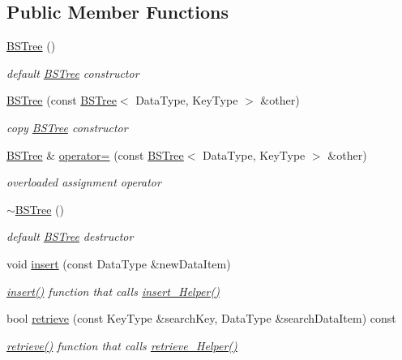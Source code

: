 \subsection*{Public Member Functions}
\begin{DoxyCompactItemize}
\item 
\hyperlink{class_b_s_tree_a4513fc6697f5e51bff8e7c448b446c9e}{B\+S\+Tree} ()
\begin{DoxyCompactList}\small\item\em default \hyperlink{class_b_s_tree}{B\+S\+Tree} constructor \end{DoxyCompactList}\item 
\hyperlink{class_b_s_tree_a6658391c178cb35858c9c465e1839fb0}{B\+S\+Tree} (const \hyperlink{class_b_s_tree}{B\+S\+Tree}$<$ Data\+Type, Key\+Type $>$ \&other)
\begin{DoxyCompactList}\small\item\em copy \hyperlink{class_b_s_tree}{B\+S\+Tree} constructor \end{DoxyCompactList}\item 
\hyperlink{class_b_s_tree}{B\+S\+Tree} \& \hyperlink{class_b_s_tree_ac36b0b564aa3c411c239d730f506f448}{operator=} (const \hyperlink{class_b_s_tree}{B\+S\+Tree}$<$ Data\+Type, Key\+Type $>$ \&other)
\begin{DoxyCompactList}\small\item\em overloaded assignment operator \end{DoxyCompactList}\item 
\hyperlink{class_b_s_tree_a968c51c539f4ae41357c78b6a60fea4c}{$\sim$\+B\+S\+Tree} ()
\begin{DoxyCompactList}\small\item\em default \hyperlink{class_b_s_tree}{B\+S\+Tree} destructor \end{DoxyCompactList}\item 
void \hyperlink{class_b_s_tree_ab86b4cea496ee53076021126423d51fd}{insert} (const Data\+Type \&new\+Data\+Item)
\begin{DoxyCompactList}\small\item\em \hyperlink{class_b_s_tree_ab86b4cea496ee53076021126423d51fd}{insert()} function that calls \hyperlink{class_b_s_tree_a8db9e377d980f427645c02234f06b550}{insert\+\_\+\+Helper()} \end{DoxyCompactList}\item 
bool \hyperlink{class_b_s_tree_a4359bfee390669b5adaf0380ef62b18d}{retrieve} (const Key\+Type \&search\+Key, Data\+Type \&search\+Data\+Item) const 
\begin{DoxyCompactList}\small\item\em \hyperlink{class_b_s_tree_a4359bfee390669b5adaf0380ef62b18d}{retrieve()} function that calls \hyperlink{class_b_s_tree_a331b572e91929d110ea21ec46bc4bcd0}{retrieve\+\_\+\+Helper()} \end{DoxyCompactList}\item 

\end{DoxyCompactItemize}

